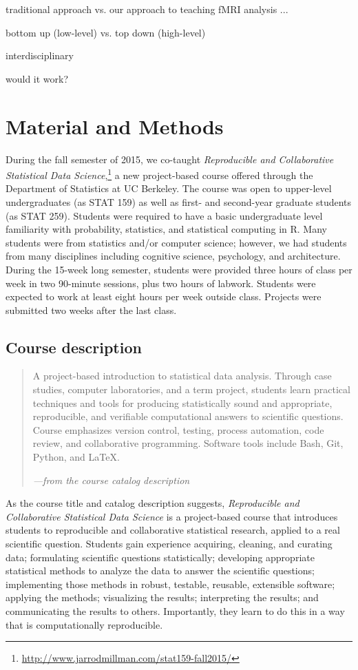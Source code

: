 traditional approach vs. our approach to teaching fMRI analysis ...

bottom up (low-level) vs. top down (high-level)

interdisciplinary

would it work?

\section{Material and Methods}

During the fall semester of 2015, we co-taught \emph{Reproducible and Collaborative
Statistical Data Science},\footnote{\url{http://www.jarrodmillman.com/stat159-fall2015/}}
a new project-based course offered through the Department of Statistics at UC Berkeley.
The course was open to upper-level undergraduates (as STAT 159) as well as
first- and second-year graduate students (as STAT 259).
Students were required to have a basic undergraduate level familiarity with
probability, statistics, and statistical computing in R.
Many students were from statistics and/or computer science; however, we had
students from many disciplines including cognitive science, psychology, and
architecture.
During the 15-week long semester, students were provided three hours of class
per week in two 90-minute sessions, plus two hours of labwork.
Students were expected to work at least eight hours per week outside class.
Projects were submitted two weeks after the last class.

\subsection{Course description}

\begin{quote}
A project-based introduction to statistical data analysis. Through case
studies, computer laboratories, and a term project, students learn
practical techniques and tools for producing statistically sound and
appropriate, reproducible, and verifiable computational answers to
scientific questions. Course emphasizes version control, testing,
process automation, code review, and collaborative programming.
Software tools include Bash, Git, Python, and \LaTeX.

\hfill\emph{---from the course catalog description}
\end{quote}

As the course title and catalog description suggests, \emph{Reproducible and
Collaborative Statistical Data Science} is a project-based course that
introduces students to reproducible and collaborative statistical research,
applied to a real scientific question.
Students gain experience acquiring, cleaning, and curating data; formulating
scientific questions statistically; developing appropriate statistical methods
to analyze the data to answer the scientific questions; implementing those
methods in robust, testable, reusable, extensible software; applying the
methods; visualizing the results; interpreting the results; and communicating
the results to others. Importantly, they learn to do this in a way that is
computationally reproducible.


